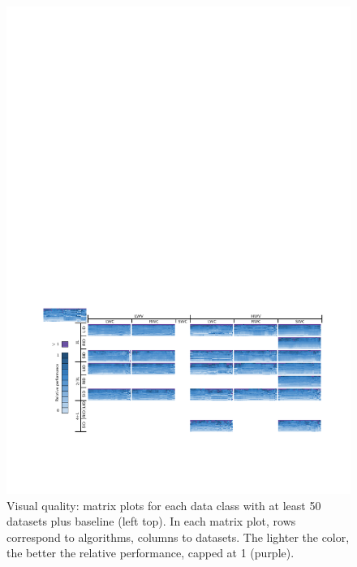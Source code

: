 \begin{figure}
    \centering
    \includegraphics{figures/treemap-evaluation/MeanArRug}
    \caption{Visual quality: matrix plots for each data class with at least 50 datasets plus baseline (left top). In each matrix plot, rows correspond to algorithms, columns to datasets. The lighter the color, the better the relative performance, capped at 1 (purple).}
    \label{fig:meanrug}
\end{figure}


